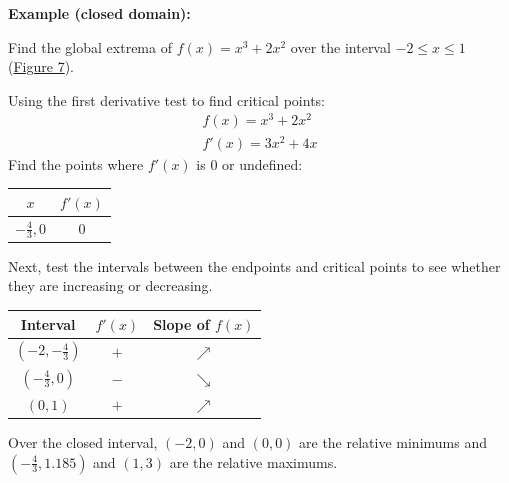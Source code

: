 \documentclass[12pt]{article}
\begin{document}
\noindent \textbf{Example (closed domain):}

\noindent Find the global extrema of $f(x) = x^3+2x^2$ over the interval $-2 \le x \le 1$ (\hyperref[fig:absextremaclosed]{Figure 7}).

\noindent Using the first derivative test to find critical points:
\begin{gather*}
    f(x) = x^3 + 2x^2 \\
    f'(x) = 3x^2 + 4x
\end{gather*}
Find the points where $f'(x)$ is $0$ or undefined:
\begin{center}
    \begin{tabular}{|c|c|}
        \hline
        $x$               & $f'(x)$ \\
        \hline \hline
        $-\frac{4}{3}, 0$ & $0$     \\
        \hline
    \end{tabular}
\end{center}
Next, test the intervals between the endpoints and critical points to see whether they are increasing or decreasing.
\begin{center}
    \begin{tabular}{|c|c|c|}
        \hline
        Interval             & $f'(x)$ & Slope of $f(x)$ \\
        \hline \hline
        $(-2, -\frac{4}{3})$ & $+$     & $\nearrow$      \\
        \hline
        $(-\frac{4}{3}, 0)$  & $-$     & $\searrow$      \\
        \hline
        $(0, 1)$             & $+$     & $\nearrow$      \\
        \hline
    \end{tabular}
\end{center}
Over the closed interval, $(-2, 0)$ and $(0, 0)$ are the relative minimums and $(-\frac{4}{3}, 1.185)$ and $(1, 3)$ are the relative maximums.
\end{document}
